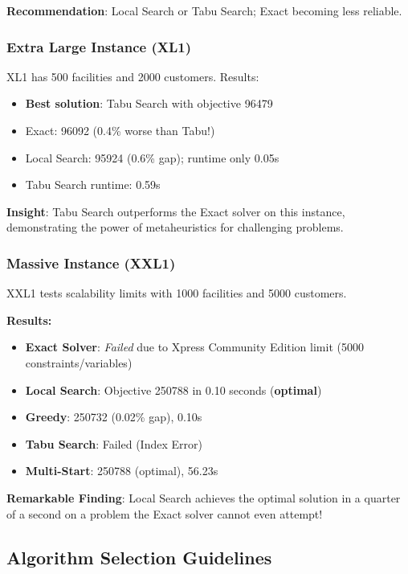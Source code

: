 \documentclass[11pt,a4paper]{article}
\begin{document}
\textbf{Recommendation}: Local Search or Tabu Search; Exact becoming less reliable.

\subsubsection{Extra Large Instance (XL1)}

XL1 has 500 facilities and 2000 customers. Results:
\begin{itemize}
  \item \textbf{Best solution}: Tabu Search with objective 96479
  \item Exact: 96092 (0.4\% worse than Tabu!)
  \item Local Search: 95924 (0.6\% gap); runtime only 0.05s
  \item Tabu Search runtime: 0.59s
\end{itemize}

\textbf{Insight}: Tabu Search outperforms the Exact solver on this instance, demonstrating the power of metaheuristics for challenging problems.

\subsubsection{Massive Instance (XXL1)}

XXL1 tests scalability limits with 1000 facilities and 5000 customers.

\textbf{Results:}
\begin{itemize}
  \item \textbf{Exact Solver}: \textit{Failed} due to Xpress Community Edition limit (5000 constraints/variables)
  \item \textbf{Local Search}: Objective 250788 in 0.10 seconds (\textbf{optimal})
  \item \textbf{Greedy}: 250732 (0.02\% gap), 0.10s
  \item \textbf{Tabu Search}: Failed (Index Error)
  \item \textbf{Multi-Start}: 250788 (optimal), 56.23s
\end{itemize}

\textbf{Remarkable Finding}: Local Search achieves the optimal solution in a quarter of a second on a problem the Exact solver cannot even attempt!

\subsection{Algorithm Selection Guidelines}
\end{document}
